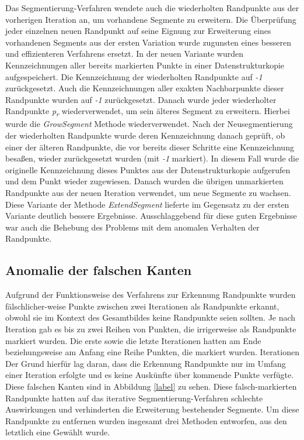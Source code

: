 Das Segmentierung-Verfahren wendete auch die wiederholten Randpunkte aus der vorherigen Iteration an, um vorhandene Segmente zu erweitern. Die Überprüfung jeder einzelnen neuen Randpunkt auf seine Eignung zur Erweiterung eines vorhandenen Segments aus der ersten Variation wurde zugunsten eines besseren und effizienteren Verfahrens ersetzt. In der neuen Variante wurden Kennzeichnungen aller bereits markierten Punkte in einer Datenstrukturkopie aufgespeichert. Die Kennzeichnung der wiederholten Randpunkte auf \textit{-1} zurückgesetzt. Auch die Kennzeichnungen aller exakten Nachbarpunkte dieser Randpunkte wurden auf \textit{-1} zurückgesetzt. Danach wurde jeder wiederholter Randpunkte \textit{p\textsubscript{r}} wiederverwendet, um sein älteres Segment zu erweitern. Hierbei wurde die \textit{GrowSegment} Methode wiederverwendet. Nach der Neusegmentierung der wiederholten Randpunkte wurde deren Kennzeichnung danach geprüft, ob einer der älteren Randpunkte, die vor bereits dieser Schritte eine Kennzeichnung besaßen, wieder zurückgesetzt wurden (mit \textit{-1} markiert). In diesem Fall wurde die originelle Kennzeichnung dieses Punktes aus der Datenstrukturkopie aufgerufen und dem Punkt wieder zugewiesen. Danach wurden die übrigen unmarkierten Randpunkte aus der neuen Iteration verwendet, um neue Segmente zu wachsen. Diese Variante der Methode \textit{ExtendSegment} lieferte im Gegensatz zu der ersten Variante deutlich bessere Ergebnisse. Ausschlaggebend für diese guten Ergebnisse war auch die Behebung des Problems mit dem anomalen Verhalten der Randpunkte.

\subsection{Anomalie der falschen Kanten} \label{false_edges}
Aufgrund der Funktionsweise des Verfahrens zur Erkennung Randpunkte wurden fälschlicher-weise Punkte zwischen zwei Iterationen als Randpunkte erkannt, obwohl sie im Kontext des Gesamtbildes keine Randpunkte seien sollten. Je nach Iteration gab es bis zu zwei Reihen von Punkten, die irrigerweise als Randpunkte markiert wurden. Die erste sowie die letzte Iterationen hatten am Ende beziehungsweise am Anfang eine Reihe Punkten, die markiert wurden. Iterationen  Der Grund hierfür lag daran, dass die Erkennung Randpunkte nur im Umfang einer Iteration erfolgte und es keine Auskünfte über kommende Punkte verfügte. Diese falschen Kanten sind in Abbildung \ref{label} zu sehen. Diese falsch-markierten Randpunkte hatten auf das iterative Segmentierung-Verfahren schlechte Auswirkungen und verhinderten die Erweiterung bestehender Segmente. Um diese Randpunkte zu entfernen wurden insgesamt drei Methoden entworfen, aus den letztlich eine Gewählt wurde.

